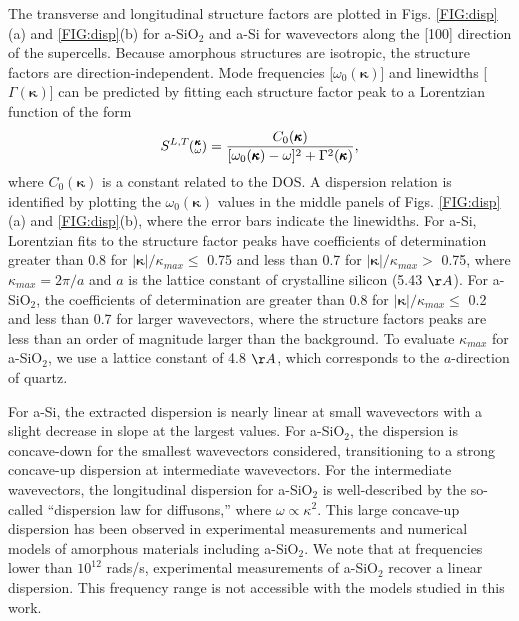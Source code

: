 The transverse and longitudinal structure factors are plotted in Figs. 
\ref{FIG:disp}(a) and \ref{FIG:disp}(b) for 
a-SiO$_2$ and a-Si for wavevectors along the 
[100] direction of the 
supercells. Because amorphous structures are isotropic, 
the structure factors are direction-independent. 
Mode frequencies [$\omega_0(\pmb{\kappa})$] and linewidths 
[$\Gamma(\pmb{\kappa})$] can be 
predicted by fitting each structure 
factor peak to a Lorentzian function of the form
\begin{equation}\label{EQ:Lorentzian_SLT}
\begin{split}
S^{L,T}\mspace{-4.0mu}\left(\mspace{-8.0mu} \begin{smallmatrix}&\pmb{\kappa} \\&\omega\end{smallmatrix} \mspace{-3.0mu}\right) = 
\frac{C_0(\pmb{\kappa})}{[\omega_0(\pmb{\kappa})-\omega]^2+
\Gamma^2(\pmb{\kappa})},
\end{split}
\end{equation}
where $C_0(\pmb{\kappa})$ is a constant related to the DOS.
\cite{beltukov_ioffe-regel_2013} A dispersion relation is identified by 
plotting the $\omega_0(\pmb{\kappa})$ values in the middle panels of 
Figs. \ref{FIG:disp}(a) and \ref{FIG:disp}(b), 
where the error bars indicate the linewidths. 
For a-Si, Lorentzian fits to the structure factor peaks 
have coefficients of determination\cite{cowpe_temporally_2008} 
greater than 0.8 for $|\pmb{\kappa}|/\kappa_{max} \le$ 0.75 and less 
than 0.7 for $|\pmb{\kappa}|/\kappa_{max} >$ 0.75, 
where $\kappa_{max} = 2\pi/a$ and $a$ is the lattice constant 
of crystalline silicon (5.43 $\AA$).\cite{stillinger_computer_1985} 
For a-SiO$_2$, the coefficients of determination 
are greater than 0.8 for $|\pmb{\kappa}|/\kappa_{max} \le$ 0.2  
and less than 0.7 for 
larger wavevectors, where the structure factors peaks are less 
than an order of magnitude larger than the background. 
To evaluate $\kappa_{max}$ for a-SiO$_2$, we use a lattice 
constant of 4.8 $\AA$, which corresponds to the $a$-direction 
of quartz.\cite{wyckoff_crystal_1963} 

For a-Si, the extracted dispersion is 
nearly linear at small wavevectors with a slight 
decrease in slope at the largest values.
\cite{feldman_thermal_1993,feldman_numerical_1999} 
For a-SiO$_2$, the dispersion is concave-down for 
the smallest wavevectors considered, transitioning to a strong 
concave-up dispersion at intermediate wavevectors. 
For the intermediate wavevectors, 
the longitudinal dispersion for a-SiO$_2$ 
is well-described by the so-called 
``dispersion law for diffusons,'' where $\omega \propto \kappa^2$.
\cite{beltukov_ioffe-regel_2013} This large concave-up dispersion has 
been observed in experimental measurements and numerical models of 
amorphous materials
\cite{taraskin_determination_1999,horbach_high_2001,
feldman_calculations_2002,ruzicka_evidence_2004,baldi_thermal_2008} 
including a-SiO$_2$.\cite{taraskin_determination_1999,horbach_high_2001,
ruzicka_evidence_2004,baldi_thermal_2008} 
We note that at frequencies lower than $10^{12}$ rads/s, 
experimental measurements of a-SiO$_2$ recover a linear dispersion.
\cite{ruocco_high-frequency_2001,ruzicka_evidence_2004,
baldi_thermal_2008,baldi_sound_2010,baldi_emergence_2013} This frequency 
range is not accessible with the models studied in this work. 

